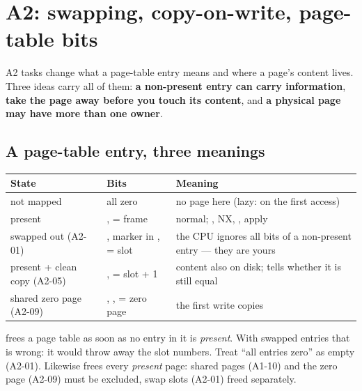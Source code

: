 \chapter{A2: swapping, copy-on-write, page-table bits}
\label{ch:a2}

A2 tasks change what a page-table entry means and where a page's content lives. Three ideas
carry all of them: \textbf{a non-present entry can carry information}, \textbf{take the page
away before you touch its content}, and \textbf{a physical page may have more than one owner}.

\section{A page-table entry, three meanings}

\begin{center}
\small
\begin{tabular}{L{3.6cm}L{4.4cm}L{6.8cm}}
\toprule
\textbf{State} & \textbf{Bits} & \textbf{Meaning} \\
\midrule
not mapped & all zero & no page here (lazy:  on the first access) \\
present & ,  = frame & normal; , NX, ,  apply \\
swapped out (A2-01) & , marker in ,  = slot & the CPU ignores all bits of a non-present entry --- they are yours \\
present + clean copy (A2-05) & ,  = slot + 1 & content also on disk;  tells whether it is still equal \\
shared zero page (A2-09) & , ,  = zero page & the first write copies \\
\bottomrule
\end{tabular}
\end{center}

\begin{trapbox}
 frees a page table as soon as no entry in it is \emph{present}. With
swapped entries that is wrong: it would throw away the slot numbers. Treat ``all entries zero'' as
empty (A2-01). Likewise  frees every \emph{present} page: shared
pages (A1-10) and the zero page (A2-09) must be excluded, swap slots (A2-01) freed separately.
\end{trapbox}

